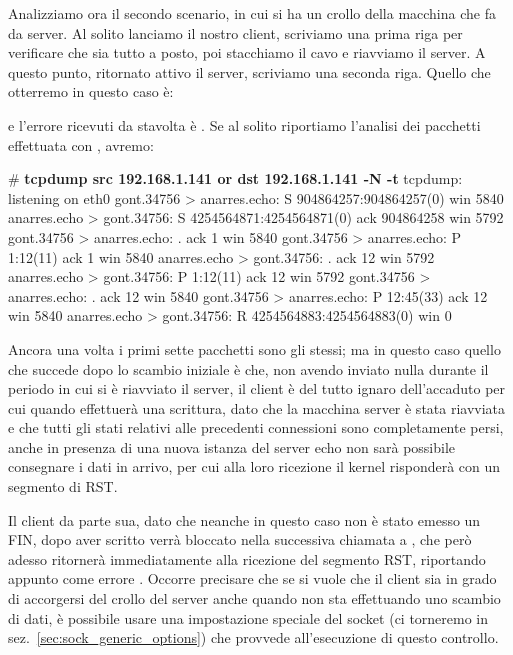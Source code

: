 Analizziamo ora il secondo scenario, in cui si ha un crollo della macchina che
fa da server. Al solito lanciamo il nostro client, scriviamo una prima riga
per verificare che sia tutto a posto, poi stacchiamo il cavo e riavviamo il
server. A questo punto, ritornato attivo il server, scriviamo una seconda
riga. Quello che otterremo in questo caso è:
e l'errore ricevuti da  stavolta è . Se al
solito riportiamo l'analisi dei pacchetti effettuata con ,
avremo:
\begin{Console}
# \textbf{tcpdump src 192.168.1.141 or dst 192.168.1.141 -N -t}
tcpdump: listening on eth0
gont.34756 > anarres.echo: S 904864257:904864257(0) win 5840 
anarres.echo > gont.34756: S 4254564871:4254564871(0) ack 904864258 win 5792
gont.34756 > anarres.echo: . ack 1 win 5840 
gont.34756 > anarres.echo: P 1:12(11) ack 1 win 5840
anarres.echo > gont.34756: . ack 12 win 5792 
anarres.echo > gont.34756: P 1:12(11) ack 12 win 5792
gont.34756 > anarres.echo: . ack 12 win 5840 
gont.34756 > anarres.echo: P 12:45(33) ack 12 win 5840
anarres.echo > gont.34756: R 4254564883:4254564883(0) win 0 
\end{Console}

Ancora una volta i primi sette pacchetti sono gli stessi; ma in questo caso
quello che succede dopo lo scambio iniziale è che, non avendo inviato nulla
durante il periodo in cui si è riavviato il server, il client è del tutto
ignaro dell'accaduto per cui quando effettuerà una scrittura, dato che la
macchina server è stata riavviata e che tutti gli stati relativi alle
precedenti connessioni sono completamente persi, anche in presenza di una
nuova istanza del server echo non sarà possibile consegnare i dati in arrivo,
per cui alla loro ricezione il kernel risponderà con un segmento di RST.

Il client da parte sua, dato che neanche in questo caso non è stato emesso un
FIN, dopo aver scritto verrà bloccato nella successiva chiamata a ,
che però adesso ritornerà immediatamente alla ricezione del segmento RST,
riportando appunto come errore . Occorre precisare che se
si vuole che il client sia in grado di accorgersi del crollo del server anche
quando non sta effettuando uno scambio di dati, è possibile usare una
impostazione speciale del socket (ci torneremo in
sez.~\ref{sec:sock_generic_options}) che provvede all'esecuzione di questo
controllo.



